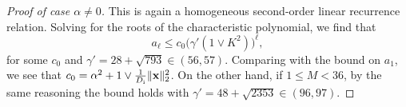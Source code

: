 \documentclass[twoside]{article}
\renewcommand{\ss}[1]{_{\text{#1}}}
\newcommand{\vx}{\mathbf{x}}
\renewcommand{\ss}[1]{_{\text{#1}}}        %
\DeclarePairedDelimiter\norm{\|}{\|}             %
\theoremstyle{theoremstyle}
\begin{document}
\begin{proof}[Proof of case $\alpha \neq 0$]
    This is again a homogeneous second-order linear recurrence relation.
    Solving for the roots of the characteristic polynomial, we find that
    \begin{equation}
        a_{\ell} \le c_0 \Big(\gamma' (1 \lor K^2)\Big)^\ell,
    \end{equation}
    for some $c_0$ and $\gamma' = 28 + \sqrt{793} \in (56,57)$.
    Comparing with the bound on $a_1$, we see that $c_0 = \alpha^2 + 1 \lor \tfrac1{D\ss{i}}\norm{\vx}_2^2$. On the other hand, if $1\le M < 36$, by the same reasoning the bound holds with $\gamma' = 48 + \sqrt{2353} \in (96,97)$.
\end{proof}

\end{document}
